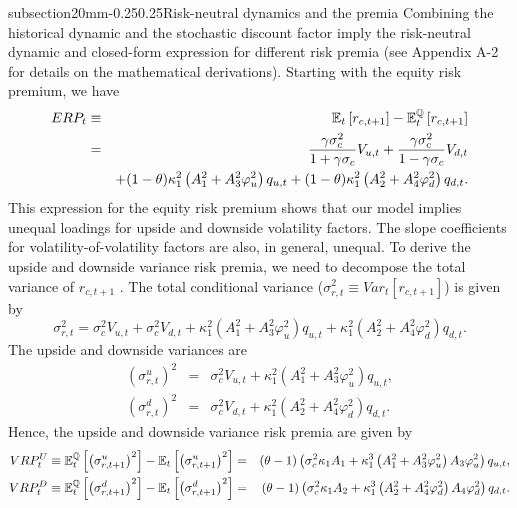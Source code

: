\documentclass[11pt]{article}
\makeatletter
\renewcommand\subsection{\@startsection%
    {subsection}{2}{0mm}{-0.25\baselineskip}{0.25\baselineskip}{\bfseries\large}}
\makeatother
\begin{document}
\subsection{Risk-neutral dynamics and the premia}
Combining the historical dynamic and the stochastic discount factor imply the risk-neutral dynamic  and closed-form expression for different risk  premia (see Appendix A-2 for details on the mathematical derivations). Starting with the equity risk premium, we have
\begin{eqnarray}
ERP_{t}&\equiv &\mathbb{E}_{t}\left[ r_{c,t+1}\right] -\mathbb{E}_{t}^{%
\mathbb{Q}}\left[ r_{c,t+1}\right]\nonumber \\
&=& \frac{\gamma \sigma _{c}^{2}}{1+\gamma \sigma _{c}}V_{u,t}+%
\frac{\gamma \sigma _{c}^{2}}{1-\gamma \sigma _{c}}V_{d,t}\nonumber \\
&&+(1-\theta)\kappa
_{1}^{2}\left( A_{1}^{2}+A_{3}^{2}\varphi _{u}^{2}\right)
q_{u,t}+(1-\theta)\kappa _{1}^{2}\left( A_{2}^{2}+A_{4}^{2}\varphi
_{d}^{2}\right) q_{d,t}.\label{EqEqPremFinal}
\end{eqnarray}
This expression for the equity risk premium shows that our
model implies unequal loadings for upside and downside volatility factors. The slope coefficients for volatility-of-volatility
factors are also, in general, unequal. To derive the upside and downside variance risk premia, we need to decompose the total variance of $r_{c,t+1}$ . The total conditional variance ($\sigma _{r,t}^{2} \equiv Var_{t}\left[r_{c,t+1}\right]$) is given by
\begin{equation*}
\sigma _{r,t}^{2} =\sigma _{c}^{2}V_{u,t}+\sigma _{c}^{2}V_{d,t}+\kappa _{1}^{2}\left( A_{1}^{2}+A_{3}^{2}\varphi _{u}^{2}\right)
q_{u,t}+\kappa _{1}^{2}\left( A_{2}^{2}+A_{4}^{2}\varphi _{d}^{2}\right)
q_{d,t}.
\end{equation*}%
The upside and downside variances are%
\begin{eqnarray}
\left( \sigma _{r,t}^{u}\right) ^{2} &=&\sigma _{c}^{2}V_{u,t}+\kappa
_{1}^{2}\left( A_{1}^{2}+A_{3}^{2}\varphi _{u}^{2}\right) q_{u,t},
\label{EqUpsideVariance} \\
\left( \sigma _{r,t}^{d}\right) ^{2} &=&\sigma _{c}^{2}V_{d,t}+\kappa
_{1}^{2}\left( A_{2}^{2}+A_{4}^{2}\varphi _{d}^{2}\right) q_{d,t}.
\label{EqDownsideVariance}
\end{eqnarray}%
Hence, the upside and downside variance
risk premia are given by
\begin{eqnarray}
VRP_{t}^{U} \equiv \mathbb{E}_{t}^{\mathbb{Q}}\left[ \left( \sigma _{r,t+1}^{u}\right) ^{2}\right]-\mathbb{E}_{t}\left[ \left( \sigma _{r,t+1}^{u}\right) ^{2}\right]&=&(\theta -1)\left( \sigma _{c}^{2}\kappa _{1}A_{1}+\kappa _{1}^{3}\left(A_{1}^{2}+A_{3}^{2}\varphi _{u}^{2}\right) A_{3}\varphi _{u}^{2}\right)q_{u,t},  \nonumber\\
VRP_{t}^{D} \equiv \mathbb{E}_{t}^{%
\mathbb{Q}}\left[ \left( \sigma _{r,t+1}^{d}\right) ^{2}\right]- \mathbb{E}_{t}\left[ \left( \sigma _{r,t+1}^{d}\right) ^{2}\right]&=&(\theta -1)\left( \sigma _{c}^{2}\kappa _{1}A_{2}+\kappa _{1}^{3}\left(A_{2}^{2}+A_{4}^{2}\varphi _{d}^{2}\right) A_{4}\varphi _{d}^{2}\right)q_{d,t}.  \nonumber
\end{eqnarray}
\end{document}
